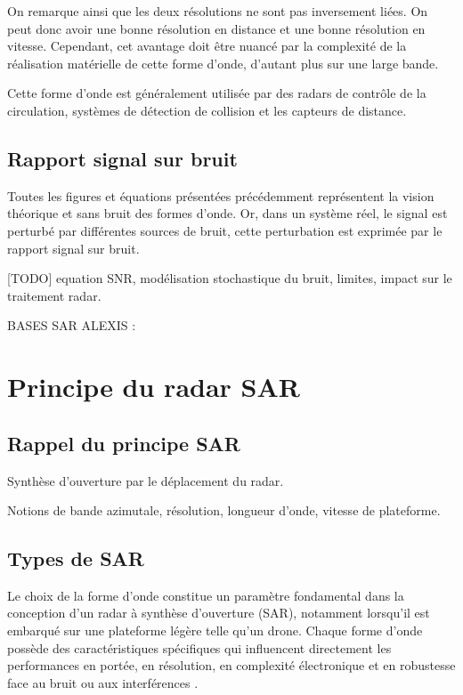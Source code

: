 On remarque ainsi que les deux résolutions ne sont pas inversement liées. On peut donc avoir une bonne résolution en distance et une bonne résolution en vitesse. Cependant, cet avantage doit être nuancé par la complexité de la réalisation matérielle de cette forme d'onde, d'autant plus sur une large bande. 

Cette forme d'onde est généralement utilisée par des radars de contrôle de la circulation, systèmes de détection de collision et les capteurs de distance.

\subsection{Rapport signal sur bruit}
Toutes les figures et équations présentées précédemment représentent la vision théorique et sans bruit des formes d'onde. Or, dans un  système réel, le signal est perturbé par différentes sources de bruit, cette perturbation est exprimée par le rapport signal sur bruit.

[TODO] equation SNR, modélisation stochastique du bruit, limites, impact sur le traitement radar.



BASES SAR ALEXIS : 

\section{Principe du radar SAR}\label{SEC:Principe du radar SAR}

\subsection{Rappel du principe SAR}

Synthèse d’ouverture par le déplacement du radar.

Notions de bande azimutale, résolution, longueur d’onde, vitesse de plateforme.


\subsection{Types de SAR}

Le choix de la forme d’onde constitue un paramètre fondamental dans la conception d’un radar à synthèse d’ouverture (SAR), notamment lorsqu’il est embarqué sur une plateforme légère telle qu’un drone. Chaque forme d’onde possède des caractéristiques spécifiques qui influencent directement les performances en portée, en résolution, en complexité électronique et en robustesse face au bruit ou aux interférences \cite{richards2010principles, soumekh1999synthetic}.

